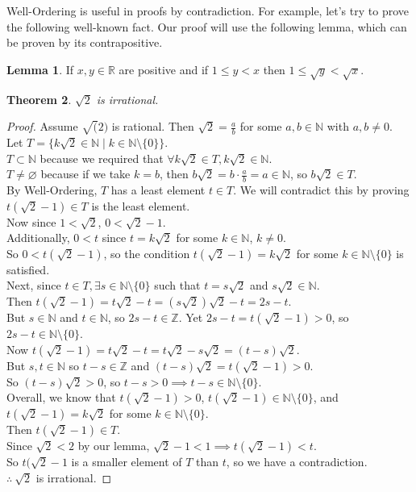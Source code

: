 \documentclass[11pt]{amsart}
\newtheorem{theorem}{Theorem}[section]
\theoremstyle{definition}
\newtheorem{lemma}[theorem]{Lemma}
\newcommand{\reals}{\mathbb{R}}
\newcommand{\integers}{\mathbb{Z}}
\newcommand{\naturals}{\mathbb{N}}
\let\emptyset\varnothing
\begin{document}
Well-Ordering is useful in proofs by contradiction. For example, let's try to prove the following well-known fact. Our proof will use the
following lemma, which can be proven by its contrapositive.
\begin{lemma}
	If $x, y \in \reals$ are positive and if $1 \leq y < x$ then $1 \leq \sqrt{y} < \sqrt{x}$.
\end{lemma}
\begin{theorem}
	$\sqrt{2}$ is irrational.
\end{theorem}
\begin{proof}
	Assume $\sqrt(2)$ is rational. Then $\sqrt{2} = \frac{a}{b}$ for some $a, b \in \naturals$ with $a, b \neq 0$. \\
	Let $T = \{ k\sqrt{2} \in \naturals \mid k \in \naturals \setminus \{ 0 \} \}$. \\
	$T \subset \naturals$ because we required that $\forall k\sqrt{2} \in T, k\sqrt{2} \in \naturals$. \\
	$T \neq \emptyset$ because if we take $k = b$, then $b\sqrt{2} = b \cdot \frac{a}{b} = a \in \naturals$, so $b\sqrt{2} \in T$. \\
	By Well-Ordering, $T$ has a least element $t \in T$. We will contradict this by proving $t(\sqrt{2} - 1) \in T$ is the least element. \\
	Now since $1 < \sqrt{2}$, $0 < \sqrt{2} - 1$. \\
	Additionally, $0 < t$ since $t = k\sqrt{2}$ for some $k \in \naturals$, $k \neq 0$. \\
	So $0 < t(\sqrt{2} - 1)$, so the condition $t(\sqrt{2} - 1) = k\sqrt{2}$ for some $k \in \naturals \setminus \{ 0 \}$ is satisfied. \\
	Next, since $t \in T, \exists s \in \naturals \setminus \{ 0 \}$ such that $t = s\sqrt{2}$ and $s\sqrt{2} \in \naturals$. \\
	Then $t(\sqrt{2} - 1) = t\sqrt{2} - t = (s\sqrt{2})\sqrt{2} - t = 2s - t$. \\
	But $s \in \naturals$ and $t \in \naturals$, so $2s - t \in \integers$. Yet $2s - t = t(\sqrt{2} - 1) > 0$, so $2s - t \in \naturals \setminus \{ 0 \}$. \\
	Now $t(\sqrt{2} - 1) = t\sqrt{2} - t = t\sqrt{2} - s\sqrt{2} = (t - s)\sqrt{2}$. \\
	But $s, t \in \naturals$ so $t - s \in \integers$ and $(t - s)\sqrt{2} = t(\sqrt{2} - 1) > 0$. \\
	So $(t - s)\sqrt{2} > 0$, so $t - s > 0 \implies t - s \in \naturals \setminus \{ 0 \}$. \\
	Overall, we know that $t(\sqrt{2} - 1) > 0$, $t(\sqrt{2} - 1) \in \naturals \setminus \{ 0 \}$, and $t(\sqrt{2} - 1) = k\sqrt{2}$ for some
	$k \in \naturals \setminus \{ 0 \}$. \\
	Then $t(\sqrt{2} - 1) \in T$. \\
	Since $\sqrt{2} < 2$ by our lemma, $\sqrt{2} - 1 < 1 \implies t(\sqrt{2} - 1) < t$. \\
	So $t(\sqrt{2} - 1$ is a smaller element of $T$ than $t$, so we have a contradiction. \\
	$\therefore \: \sqrt{2}$ is irrational.
\end{proof}
\end{document}
